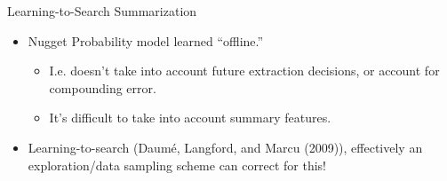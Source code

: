 \begin{frame}{Learning-to-Search Summarization}

 \begin{itemize}
   \item Nugget Probability model learned ``offline.'' 
   \begin{itemize}
     \item I.e. doesn't take into account future extraction decisions, or 
           account for compounding error.
     \item It's difficult to take into account summary features.
   \end{itemize}
   \item<4-> Learning-to-search (Daum\'e, Langford, and Marcu (2009)), effectively an exploration/data sampling scheme
       can correct for this!
 \end{itemize}

    \begin{center}
\end{center}
\end{frame}



